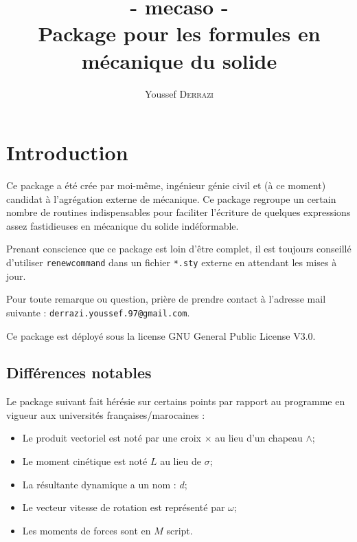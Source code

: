 \documentclass[12pt]{article}
\begin{document}

\title{- mecaso -\\Package pour les formules en mécanique du solide}
\author{Youssef \textsc{Derrazi}}
\maketitle

\tableofcontents
\newpage
{}

\section{Introduction}
Ce package a été crée par moi-même, ingénieur génie civil et (à ce moment) candidat à l'agrégation externe de mécanique. Ce package regroupe un certain nombre de routines indispensables pour faciliter l'écriture de quelques expressions assez fastidieuses en mécanique du solide indéformable.
\vspace{12pt}

Prenant conscience que ce package est loin d'être complet, il est toujours conseillé d'utiliser \verb|renewcommand| dans un fichier \verb|*.sty| externe en attendant les mises à jour.
\vspace{12pt}

Pour toute remarque ou question, prière de prendre contact à l'adresse mail suivante : \verb|derrazi.youssef.97@gmail.com|.
\vspace{12pt}

Ce package est déployé sous la license GNU General Public License V3.0.

\subsection{Différences notables}
Le package suivant fait hérésie sur certains points par rapport au programme en vigueur aux universités françaises/marocaines :

\begin{itemize}
\item Le produit vectoriel est noté par une croix $\times$ au lieu d'un chapeau $\wedge$;
\item Le moment cinétique est noté $L$ au lieu de $\sigma$;
\item La résultante dynamique a un nom : $d$;
\item Le vecteur vitesse de rotation est représenté par $\omega$;
\item Les moments de forces sont en $M$ script.
\end{itemize}
\end{document}
